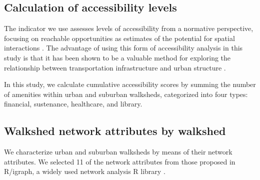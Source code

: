 \documentclass[preprint, 3p,
authoryear]{elsarticle} %
\begin{document}
\subsection{Calculation of accessibility
levels}\label{calculation-of-accessibility-levels}

The indicator we use assesses levels of accessibility from a normative
perspective, focusing on reachable opportunities as estimates of the
potential for spatial interactions \citet{Hansen1959}. The advantage of
using this form of accessibility analysis in this study is that it has
been shown to be a valuable method for exploring the relationship
between transportation infrastructure and urban structure
\citet{Handy1997}.

In this study, we calculate cumulative accessibility scores by summing
the number of amenities within urban and suburban walksheds, categorized
into four types: financial, sustenance, healthcare, and library.

\subsection{Walkshed network attributes by
walkshed}\label{walkshed-network-attributes-by-walkshed}

We characterize urban and suburban walksheds by means of their network
attributes. We selected 11 of the network attributes from those proposed
in R/igraph, a widely used network analysis R library
\citet{IgraphManual}.
\end{document}

